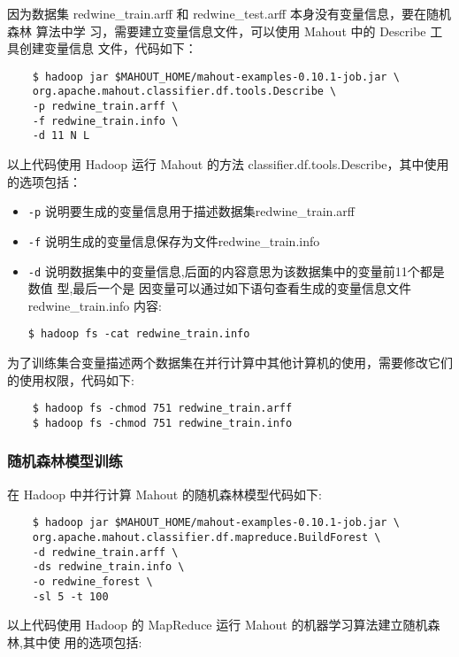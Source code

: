 因为数据集 redwine\_train.arff 和 redwine\_test.arff
本身没有变量信息，要在随机森林 算法中学 习，需要建立变量信息文件，可以使用
Mahout 中的 Describe 工具创建变量信息 文件，代码如下：

\begin{lstlisting}
	$ hadoop jar $MAHOUT_HOME/mahout-examples-0.10.1-job.jar \
	org.apache.mahout.classifier.df.tools.Describe \
	-p redwine_train.arff \
	-f redwine_train.info \
	-d 11 N L
\end{lstlisting}

以上代码使用 Hadoop 运行 Mahout 的方法
classifier.df.tools.Describe，其中使用的选项包括：

\begin{itemize}
\item
  \lstinline!-p!  说明要生成的变量信息用于描述数据集redwine\_train.arff
\item
  \lstinline!-f! 说明生成的变量信息保存为文件redwine\_train.info
\item
  \lstinline!-d! 说明数据集中的变量信息,后面的内容意思为该数据集中的变量前11个都是数值
  型,最后一个是 因变量可以通过如下语句查看生成的变量信息文件
  redwine\_train.info 内容:

\begin{lstlisting}
$ hadoop fs -cat redwine_train.info
\end{lstlisting}
\end{itemize}

为了训练集合变量描述两个数据集在并行计算中其他计算机的使用，需要修改它们的使用权限，代码如下:

\begin{lstlisting}
	$ hadoop fs -chmod 751 redwine_train.arff
	$ hadoop fs -chmod 751 redwine_train.info
\end{lstlisting}

\subsubsection{随机森林模型训练}\label{ux968fux673aux68eeux6797ux6a21ux578bux8badux7ec3}

在 Hadoop 中并行计算 Mahout 的随机森林模型代码如下:

\begin{lstlisting}
	$ hadoop jar $MAHOUT_HOME/mahout-examples-0.10.1-job.jar \
	org.apache.mahout.classifier.df.mapreduce.BuildForest \
	-d redwine_train.arff \
	-ds redwine_train.info \
	-o redwine_forest \
	-sl 5 -t 100
\end{lstlisting}

以上代码使用 Hadoop 的 MapReduce 运行 Mahout
的机器学习算法建立随机森林,其中使 用的选项包括:

